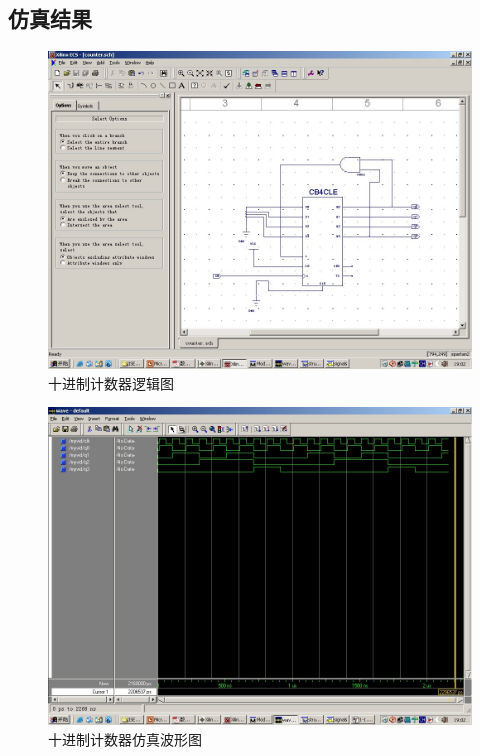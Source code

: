\documentclass{article}
\begin{document}
\begin{CJK*}{UTF8}{gbsn}


\section{仿真结果}

\begin{center}
\begin{figure}[h!]
\includegraphics[width=\textwidth]{1-1.jpg}
\caption{十进制计数器逻辑图}
\label{fig: xfig}
\end{figure}

\begin{figure}[h!]
\includegraphics[width=\textwidth]{1-2.jpg}
\caption{十进制计数器仿真波形图}
\label{fig: yfig}
\end{figure}
\end{center}

\end{CJK*}
\end{document}
